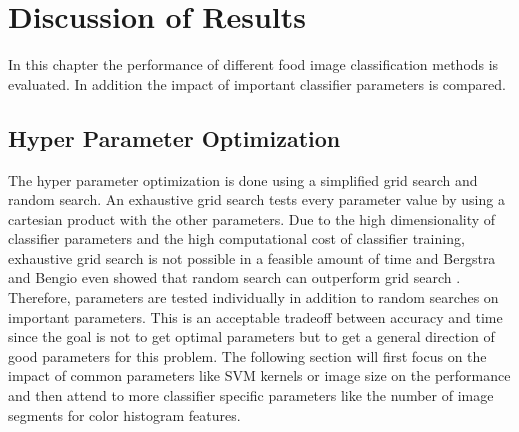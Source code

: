 
\chapter{Discussion of Results}
\label{ch:discussion}
In this chapter the performance of different food image classification methods is evaluated. In addition the impact of important classifier parameters is compared. 

\section{Hyper Parameter Optimization}
The hyper parameter optimization is done using a simplified grid search and random search. An exhaustive grid search tests every parameter value by using a cartesian product with the other parameters. Due to the high dimensionality of classifier parameters and the high computational cost of classifier training, exhaustive grid search is not possible in a feasible amount of time and Bergstra and Bengio even showed that random search can outperform grid search \cite{Bergstra2012}. Therefore, parameters are tested individually in addition to random searches on important parameters. This is an acceptable tradeoff between accuracy and time since the goal is not to get optimal parameters but to get a general direction of good parameters for this problem. The following section will first focus on the impact of common parameters like SVM kernels or image size on the performance and then attend to more classifier specific parameters like the number of image segments for color histogram features. 

